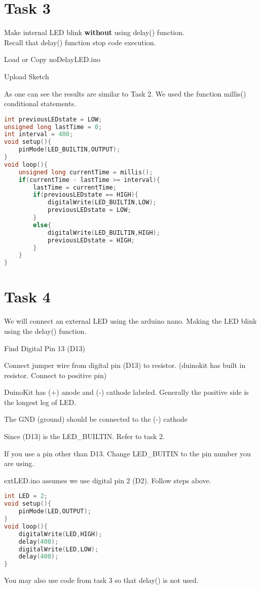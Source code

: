 \documentclass[12pt]{article}
\begin{document}
\section*{Task 3}
Make \color{red} internal LED \color{black} blink \textbf{without} using \color{blue} delay() \color{black} function. \\
Recall that \color{blue} delay() \color{black} function stop code execution. 
\begin{todolist}
    \item Load or Copy noDelayLED.ino 
    \item Upload Sketch 
\end{todolist}
As one can see the results are similar to Task 2. We used the function \color{blue} millis() \color{black} conditional statements. 
\begin{lstlisting}[language=C++, caption={noDelayLED.ino}]
int previousLEDstate = LOW;
unsigned long lastTime = 0; 
int interval = 400; 
void setup(){
    pinMode(LED_BUILTIN,OUTPUT);
}
void loop(){
    unsigned long currentTime = millis();
    if(currentTime - lastTime >= interval){
        lastTime = currentTime;
        if(previousLEDstate == HIGH){
            digitalWrite(LED_BUILTIN,LOW);
            previousLEDstate = LOW;
        }
        else{
            digitalWrite(LED_BUILTIN,HIGH);
            previousLEDstate = HIGH;
        }
    }
}
\end{lstlisting}
\section*{Task 4}
We will connect an \color{red} external LED \color{black} using the arduino nano. Making the LED blink using the \color{blue} delay() \color{black} function. 
\begin{todolist}
    \item Find Digital Pin 13 (D13) 
    \item Connect jumper wire from digital pin (D13) to resistor. (duinokit has built in resistor. Connect to positive pin) 
    \item DuinoKit has (+) anode and (-) cathode labeled. Generally the positive side is the longest leg of LED. 
    \item The GND (ground) should be connected to the (-) cathode
    \item Since (D13) is the LED\_BUILTIN. Refer to task 2. 
    \item If you use a pin other than D13. Change LED\_BUITIN to the pin number you are using. 
    \item extLED.ino assumes we use digital pin 2 (D2). Follow steps above. 
\end{todolist}
\begin{lstlisting}[language=c++,caption={extLED.ino}]
int LED = 2; 
void setup(){
    pinMode(LED,OUTPUT);
}
void loop(){
    digitalWrite(LED,HIGH);
    delay(400);
    digitalWrite(LED,LOW);
    delay(400);
}
\end{lstlisting}
You may also use code from task 3 so that \color{blue} delay()\color{black} is not used. 
\end{document}
